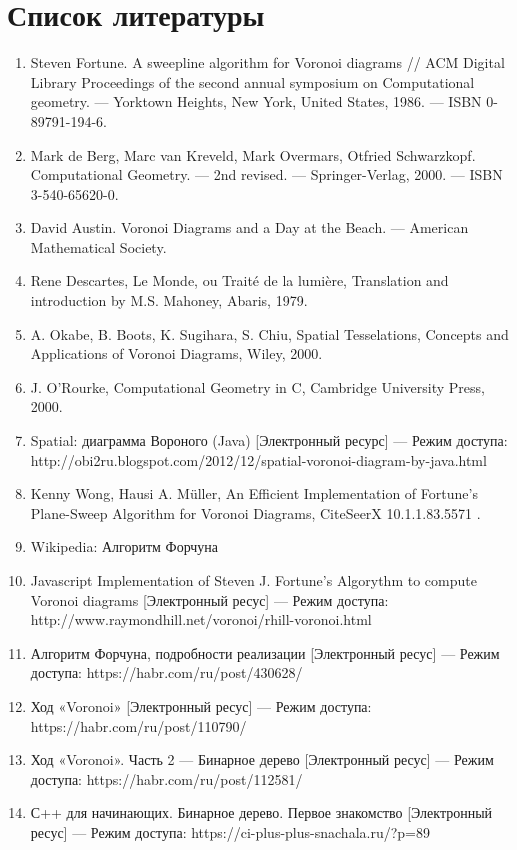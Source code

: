 \documentclass[ a4paper]{article}
\begin{document}
\clearpage
\section{Список литературы}
\begin{enumerate}
\item Steven Fortune. A sweepline algorithm for Voronoi diagrams // ACM Digital Library Proceedings of the second annual symposium on Computational geometry. — Yorktown Heights, New York, United States, 1986. — ISBN 0-89791-194-6. 
\item Mark de Berg, Marc van Kreveld, Mark Overmars, Otfried Schwarzkopf. Computational Geometry. — 2nd revised. — Springer-Verlag, 2000. — ISBN 3-540-65620-0.
\item David Austin. Voronoi Diagrams and a Day at the Beach. — American Mathematical Society.
\item Rene Descartes, Le Monde, ou Traité de la lumière, Translation and introduction by M.S. Mahoney, Abaris, 1979.
\item A. Okabe, B. Boots, K. Sugihara, S. Chiu, Spatial Tesselations, Concepts and Applications of Voronoi Diagrams, Wiley, 2000.
\item J. O'Rourke, Computational Geometry in C, Cambridge University Press, 2000.
\item Spatial: диаграмма Вороного (Java) [Электронный ресурс] — Режим доступа: http://obi2ru.blogspot.com/2012/12/spatial-voronoi-diagram-by-java.html
\item Kenny Wong, Hausi A. Müller, An Efficient Implementation of Fortune's Plane-Sweep Algorithm for Voronoi Diagrams, CiteSeerX   10.1.1.83.5571 .
\item Wikipedia: Алгоритм Форчуна 
\item Javascript Implementation of Steven J. Fortune's Algorythm to compute Voronoi diagrams [Электронный ресус] — Режим доступа: http://www.raymondhill.net/voronoi/rhill-voronoi.html
\item Алгоритм Форчуна, подробности реализации [Электронный ресус] — Режим доступа: https://habr.com/ru/post/430628/
\item Ход «Voronoi» [Электронный ресус] — Режим доступа: https://habr.com/ru/post/110790/
\item Ход «Voronoi». Часть 2 — Бинарное дерево  [Электронный ресус] — Режим доступа: https://habr.com/ru/post/112581/
\item С++ для начинающих. Бинарное дерево. Первое знакомство [Электронный ресус] — Режим доступа: https://ci-plus-plus-snachala.ru/?p=89

\end{enumerate}
\end{document}
